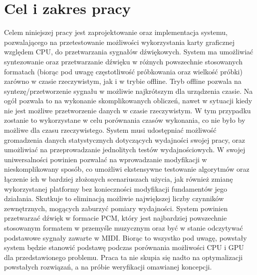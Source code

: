 \chapter*{Cel i zakres pracy}

Celem niniejszej pracy jest zaprojektowanie oraz implementacja systemu, pozwalającego na przetestowanie możliwości wykorzystania karty graficznej względem CPU, do przetwarzania sygnałów dźwiękowych. System ma umożliwiać syntezowanie oraz przetwarzanie dźwięku w różnych powszechnie stosowanych formatach (biorąc pod uwagę częstotliwość próbkowania oraz wielkość próbki) zarówno w czasie rzeczywistym, jak i w trybie offline. Tryb offline pozwala na syntezę/przetworzenie sygnału w możliwie najkrótszym dla urządzenia czasie. Na ogół pozwala to na wykonanie skomplikowanych obliczeń, nawet w sytuacji kiedy nie jest możliwe przetworzenie danych w czasie rzeczywistym. W tym przypadku zostanie to wykorzystane w celu porównania czasów wykonania, co nie było by możliwe dla czasu rzeczywistego. System musi udostępniać możliwość gromadzenia danych statystycznych dotyczących wydajności swojej pracy, oraz umożliwiać na przeprowadzanie jednolitych testów wydajnościowych. W swojej uniwersalności powinien pozwalać na wprowadzanie modyfikacji w nieskomplikowany sposób, co umożliwi ekstensywne testowanie algorytmów oraz łączenie ich w bardziej złożonych scenariuszach użycia, jak również zmianę wykorzystanej platformy bez konieczności modyfikacji fundamentów jego działania. Skutkuje to eliminacją możliwie największej liczby czynników zewnętrznych, mogących zaburzyć pomiary wydajności. System powinien przetwarzać dźwięk w formacie PCM, który jest najbardziej powszechnie stosowanym formatem w przemyśle muzycznym oraz być w stanie odczytywać podstawowe sygnały zawarte w MIDI. Biorąc to wszystko pod uwagę, powstały system będzie stanowić podstawę podczas porównania możliwości CPU i GPU dla przedstawionego problemu. Praca ta nie skupia się nadto na optymalizacji powstałych rozwiązań, a na próbie weryfikacji omawianej koncepcji.